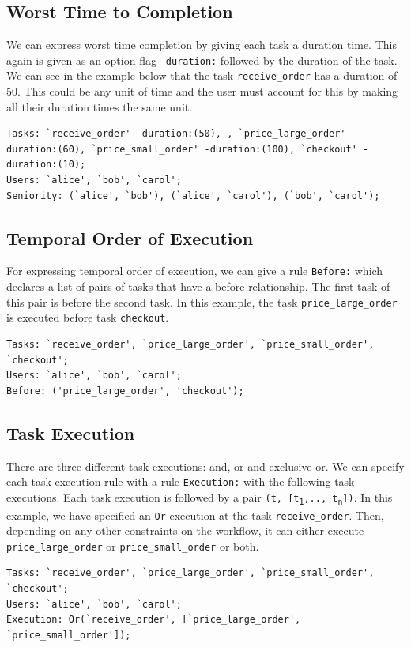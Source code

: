 \documentclass[a4paper]{report}
\begin{document}
\subsection{Worst Time to Completion}
We can express worst time completion by giving each task a duration time. This again is given as an option flag \texttt{-duration:} followed by the duration of the task. We can see in the example below that the task \texttt{receive\_order} has a duration of 50. This could be any unit of time and the user must account for this by making all their duration times the same unit.
\begin{center}
\begin{minipage}{\linewidth}
\begin{lstlisting}[frame=single]
Tasks: `receive_order' -duration:(50), , `price_large_order' -duration:(60), `price_small_order' -duration:(100), `checkout' -duration:(10); 
Users: `alice', `bob', `carol'; 
Seniority: (`alice', `bob'), (`alice', `carol'), (`bob', `carol');
\end{lstlisting}
\end{minipage}
\end{center}

\subsection{Temporal Order of Execution}
For expressing temporal order of execution, we can give a rule \texttt{Before:} which declares a list of pairs of tasks that have a before relationship. The first task of this pair is before the second task. In this example, the task \texttt{price\_large\_order} is executed before task \texttt{checkout}.
\begin{lstlisting}[frame=single]
Tasks: `receive_order', `price_large_order', `price_small_order', 
`checkout'; 
Users: `alice', `bob', `carol';
Before: ('price_large_order', 'checkout');
\end{lstlisting}

\subsection{Task Execution}
There are three different task executions: and, or and exclusive-or. We can specify each task execution rule with a rule \texttt{Execution:} with the following task executions. Each task execution is followed by a pair \texttt{(t, [t\textsubscript{1},.., t\textsubscript{n}])}. In this example, we have specified an \texttt{Or} execution at the task \texttt{receive\_order}. Then, depending on any other constraints on the workflow, it can either execute \texttt{price\_large\_order} or \texttt{price\_small\_order} or both.
\begin{lstlisting}[frame=single]
Tasks: `receive_order', `price_large_order', `price_small_order', 
`checkout'; 
Users: `alice', `bob', `carol';
Execution: Or(`receive_order', [`price_large_order', `price_small_order']);
\end{lstlisting}
\end{document}
